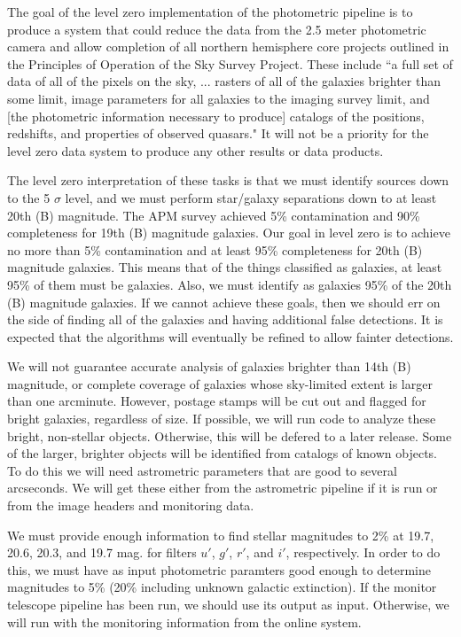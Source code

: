 
	The goal of the level zero implementation of the photometric
pipeline is to produce a system that could reduce the data from the
2.5 meter photometric camera and allow completion of all northern hemisphere
core projects outlined in the Principles of Operation of the Sky Survey 
Project.  These include ``a full set of data of all of the pixels on the sky, 
... rasters of all of the galaxies brighter than some limit, image 
parameters for all galaxies to the imaging survey limit, and [the 
photometric information necessary to produce] catalogs of the positions, 
redshifts, and properties of observed quasars."  It will not be a 
priority for the level zero data system to produce any other results 
or data products.

	The level zero interpretation of these tasks is that we must
identify sources down to the 5 $\sigma$ level, and we must perform star/galaxy
separations down to at least 20th (B) magnitude.  The APM survey achieved
5\% contamination and 90\% completeness for 19th (B) magnitude
galaxies.  Our goal in level zero is to achieve no more than 5\%
contamination and at least 95\% completeness for 20th (B) magnitude galaxies. 
This means that of the things classified as galaxies, at least 95\% of 
them must be galaxies.  Also, we must identify as galaxies 95\% of the 20th 
(B) magnitude galaxies.  If we cannot achieve these goals, then we should
err on the side of finding all of the galaxies and having additional
false detections.  It is expected that the algorithms will eventually
be refined to allow fainter detections.

We will not guarantee accurate
analysis of galaxies brighter than 14th (B) magnitude, or complete coverage
of galaxies whose sky-limited extent is larger than one arcminute.  However,
postage stamps will be cut out and flagged for bright galaxies, regardless
of size.  If possible, we will run code to analyze these
bright, non-stellar objects.  Otherwise, this will be defered to a later
release.  Some of the larger, brighter objects will be identified from
catalogs of known objects.  To do this we will need astrometric parameters 
that are good to several arcseconds.  We will get these
either from the astrometric pipeline if it is run or from the image
headers and monitoring data.

We must provide enough information to find stellar magnitudes to 2\% at 19.7, 
20.6, 20.3, and 19.7 mag. for filters $u\prime$, $g\prime$, $r\prime$, and 
$i\prime$, respectively.  In order to do this, we must have as input
photometric paramters good enough to determine magnitudes to 5\% (20\%
including unknown galactic extinction).
If the monitor telescope pipeline has been run, we should use its output
as input.  Otherwise, we will run with the monitoring information from the
online system.

